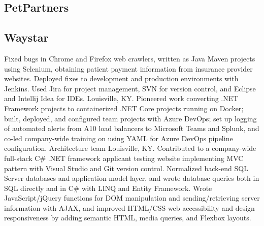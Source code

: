 \subsection{PetPartners}
\subsection{Waystar}
{Fixed bugs in Chrome and Firefox web crawlers, written as Java Maven projects using Selenium, obtaining patient payment information from insurance provider websites. Deployed fixes to development and production environments with Jenkins. Used Jira for project management, SVN for version control, and Eclipse and Intellij Idea for IDEs.
}
{Louisville, KY. Pioneered work converting .NET Framework projects to containerized .NET Core projects running on Docker; built, deployed, and configured team projects with Azure DevOps; set up logging of automated alerts from A10 load balancers to Microsoft Teams and Splunk, and co-led company-wide training on using YAML for Azure DevOps pipeline configuration.
}
{Architecture team}
{}
{Louisville, KY. Contributed to a company-wide full-stack C\# .NET framework applicant testing website implementing MVC pattern with Visual Studio and Git version control. Normalized back-end SQL Server databases and application model layer, and wrote database queries both in SQL directly and in C\# with LINQ and Entity Framework. Wrote JavaScript/jQuery functions for DOM manipulation and sending/retrieving server information with AJAX, and improved HTML/CSS web accessibility and design responsiveness by adding semantic HTML, media queries, and Flexbox layouts. }
